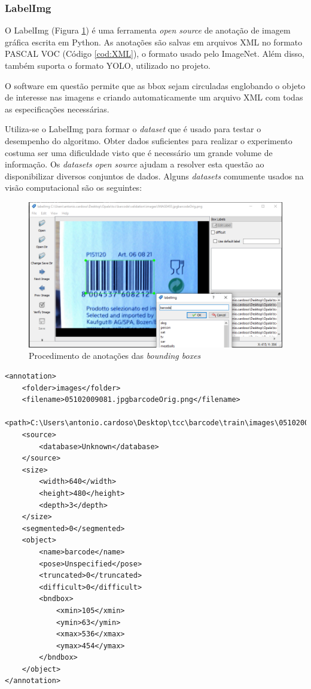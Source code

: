\subsubsection*{LabelImg}\label{sub:LabelImg}

O LabelImg (Figura \ref{fig:labelimg}) é uma ferramenta \textit{open source} de anotação de imagem gráfica escrita em Python. As anotações são salvas em arquivos XML no formato PASCAL VOC (Código \ref{cod:XML}), o formato usado pelo ImageNet. Além disso, também suporta o formato YOLO, utilizado no projeto. \cite{labelimg}

O software em questão permite que as bbox sejam circuladas englobando o objeto de interesse nas imagens e criando automaticamente um arquivo XML com todas as especificações necessárias.

Utiliza-se o LabelImg para formar o \textit{dataset} que é usado para testar o desempenho do algoritmo. Obter dados suficientes para realizar o experimento costuma ser uma dificuldade visto que é necessário um grande volume de informação. Os \textit{datasets open source} ajudam a resolver esta questão ao disponibilizar diversos conjuntos de dados. Alguns \textit{datasets} comumente usados na visão computacional são os seguintes:

\begin{figure}[H]
	\centering
	\includegraphics[width=0.9\linewidth]{figuras/MachineLearning/labelimg.png}
	\caption{Procedimento de anotações das \textit{bounding boxes}}
	\label{fig:labelimg}
\end{figure}

\begin{lstlisting}[caption=Arquivo XML gerado pelo LabelImg, label=cod:XML]
<annotation>
	<folder>images</folder>
	<filename>05102009081.jpgbarcodeOrig.png</filename>
	<path>C:\Users\antonio.cardoso\Desktop\tcc\barcode\train\images\05102009081.jpgbarcodeOrig.png</path>
	<source>
		<database>Unknown</database>
	</source>
	<size>
		<width>640</width>
		<height>480</height>
		<depth>3</depth>
	</size>
	<segmented>0</segmented>
	<object>
		<name>barcode</name>
		<pose>Unspecified</pose>
		<truncated>0</truncated>
		<difficult>0</difficult>
		<bndbox>
			<xmin>105</xmin>
			<ymin>63</ymin>
			<xmax>536</xmax>
			<ymax>454</ymax>
		</bndbox>
	</object>
</annotation>
\end{lstlisting}


